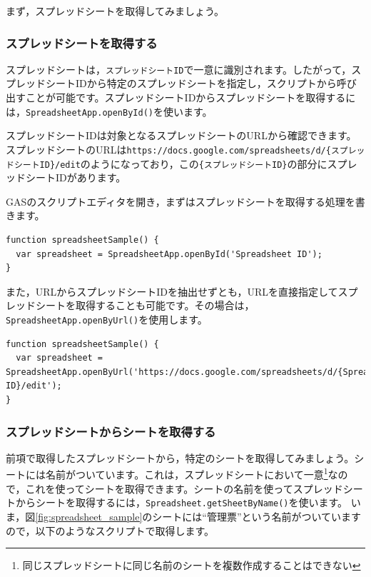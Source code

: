 \documentclass[uplatex,a4j]{jsarticle}
\begin{document}
まず，スプレッドシートを取得してみましょう。

\subsubsection{スプレッドシートを取得する}

スプレッドシートは，\verb|スプレッドシートID|で一意に識別されます。したがって，スプレッドシートIDから特定のスプレッドシートを指定し，スクリプトから呼び出すことが可能です。スプレッドシートIDからスプレッドシートを取得するには，\verb|SpreadsheetApp.openById()|を使います。

スプレッドシートIDは対象となるスプレッドシートのURLから確認できます。スプレッドシートのURLは\verb|https://docs.google.com/spreadsheets/d/{スプレッドシートID}/edit|のようになっており，この\verb|{スプレッドシートID}|の部分にスプレッドシートIDがあります。

GASのスクリプトエディタを開き，まずはスプレッドシートを取得する処理を書きます。

\begin{lstlisting}[basicstyle=\ttfamily\footnotesize,frame=single,caption=SpreadsheetApp sample 1]
function spreadsheetSample() {
  var spreadsheet = SpreadsheetApp.openById('Spreadsheet ID');
}
\end{lstlisting}

また，URLからスプレッドシートIDを抽出せずとも，URLを直接指定してスプレッドシートを取得することも可能です。その場合は，\verb|SpreadsheetApp.openByUrl()|を使用します。

\begin{lstlisting}[basicstyle=\ttfamily\footnotesize,frame=single,caption=SpreadsheetApp sample 2]
function spreadsheetSample() {
  var spreadsheet = SpreadsheetApp.openByUrl('https://docs.google.com/spreadsheets/d/{Spreadsheet ID}/edit');
}
\end{lstlisting}

\subsubsection{スプレッドシートからシートを取得する}


前項で取得したスプレッドシートから，特定のシートを取得してみましょう。シートには名前がついています。これは，スプレッドシートにおいて一意\footnote{同じスプレッドシートに同じ名前のシートを複数作成することはできない}なので，これを使ってシートを取得できます。シートの名前を使ってスプレッドシートからシートを取得するには，\verb|Spreadsheet.getSheetByName()|を使います。
いま，図\ref{fig:spreadsheet_sample}のシートには``管理票''という名前がついていますので，以下のようなスクリプトで取得します。
\end{document}
